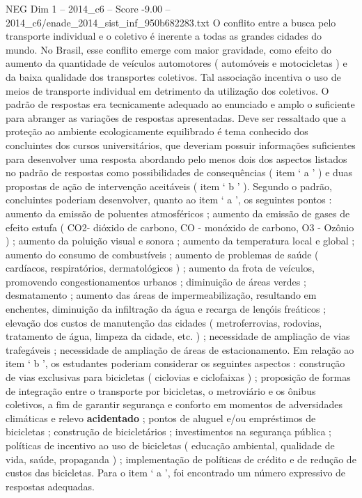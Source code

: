 \begin{textsample}{NEG Dim 1 – 2014\_c6 – Score -9.00 – 2014\_c6/enade\_2014\_sist\_inf\_950b682283.txt}
O conflito entre a busca pelo transporte individual e o coletivo é inerente a todas as grandes cidades do mundo.
No Brasil, esse conflito emerge com maior gravidade, como efeito do aumento da quantidade de veículos automotores ( automóveis e motocicletas ) e da baixa qualidade dos transportes coletivos.
Tal associação incentiva o uso de meios de transporte individual em detrimento da utilização dos coletivos.
O padrão de respostas era tecnicamente adequado ao enunciado e amplo o suficiente para abranger as variações de respostas apresentadas.
Deve ser ressaltado que a proteção ao ambiente ecologicamente equilibrado é tema conhecido dos concluintes dos cursos universitários, que deveriam possuir informações suficientes para desenvolver uma resposta abordando pelo menos dois dos aspectos listados no padrão de respostas como possibilidades de consequências ( item ‘ a ’ ) e duas propostas de ação de intervenção aceitáveis ( item ‘ b ’ ).
Segundo o padrão, concluintes poderiam desenvolver, quanto ao item ‘ a ’, os seguintes pontos : aumento da emissão de poluentes atmosféricos ; aumento da emissão de gases de efeito estufa ( CO2- dióxido de carbono, CO - monóxido de carbono, O3 - Ozônio ) ; aumento da poluição visual e sonora ; aumento da temperatura local e global ; aumento do consumo de combustíveis ; aumento de problemas de saúde ( cardíacos, respiratórios, dermatológicos ) ; aumento da frota de veículos, promovendo congestionamentos urbanos ; diminuição de áreas verdes ; desmatamento ; aumento das áreas de impermeabilização, resultando em enchentes, diminuição da infiltração da água e recarga de lençóis freáticos ; elevação dos custos de manutenção das cidades ( metroferrovias, rodovias, tratamento de água, limpeza da cidade, etc. ) ; necessidade de ampliação de vias trafegáveis ; necessidade de ampliação de áreas de estacionamento.
Em relação ao item ‘ b ’, os estudantes poderiam considerar os seguintes aspectos : construção de vias exclusivas para bicicletas ( ciclovias e ciclofaixas ) ; proposição de formas de integração entre o transporte por bicicletas, o metroviário e os ônibus coletivos, a fim de garantir segurança e conforto em momentos de adversidades climáticas e relevo \textbf{acidentado} ; pontos de aluguel e/ou empréstimos de bicicletas ; construção de bicicletários ; investimentos na segurança pública ; políticas de incentivo ao uso de bicicletas ( educação ambiental, qualidade de vida, saúde, propaganda ) ; implementação de políticas de crédito e de redução de custos das bicicletas.
Para o item ‘ a ’, foi encontrado um número expressivo de respostas adequadas.

\end{textsample}

